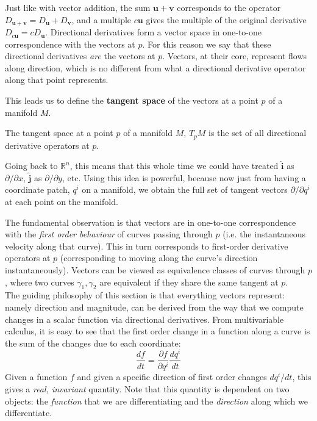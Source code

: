 	Just like with vector addition, the sum $\mathbf u + \mathbf v$ corresponds to the operator $ D_{\mathbf u + \mathbf v} = D_\mathbf u + D_\mathbf v$, and a multiple $c \mathbf u$ gives the multiple of the original derivative $D_{c \mathbf u} = c D_\mathbf u$. Directional derivatives form a vector space in one-to-one correspondence with the vectors at $p$.  For this reason we say that these directional derivatives \emph{are} the vectors at $p$. Vectors, at their core, represent flows along direction, which is no different from what a directional derivative operator along that point represents. 
	
	This leads us to define the \textbf{tangent space} of the vectors at a point $p$ of a manifold $M$.
	\begin{defn}
		The tangent space at a point $p$ of a manifold $M$, $T_p M$ is the set of all directional derivative operators at $p$.
	\end{defn}

	Going back to $\mathbb{R}^n$, this means that this whole time we could have treated $\hat{\mathbf{i}}$ as $\partial/\partial x$, $\hat{\mathbf{j}}$ as $\partial/\partial y$, etc. Using this idea is powerful, because now just from having a coordinate patch, $q^i$ on a manifold, we obtain the full set of tangent vectors $\partial/\partial q^i$ at each point on the manifold. 
	
	The fundamental observation is that vectors are in one-to-one correspondence with the \emph{first order behaviour} of curves passing through $p$ (i.e. the instantaneous velocity along that curve). This in turn corresponds to first-order derivative operators at $p$ (corresponding to moving along the curve's direction instantaneously). Vectors can be viewed as equivalence classes of curves through $p$, where two curves $\gamma_1, \gamma_2$ are equivalent if they share the same tangent at $p$. \\
	
	The guiding philosophy of this section is that everything vectors represent: namely direction and magnitude, can be derived from the way that we compute changes in a scalar function via directional derivatives. From multivariable calculus, it is easy to see that the first order change in a function along a curve is the sum of the changes due to each coordinate:
	\begin{equation}
		\frac{df}{dt} = \frac{\partial f}{\partial q^i} \frac{dq^i}{dt}
	\end{equation}
	Given a function $f$ and given a specific direction of first order changes $dq^i/dt$, this gives a \emph{real, invariant} quantity. Note that this quantity is dependent on two objects: the \emph{function} that we are differentiating and the \emph{direction} along which we differentiate.
	
